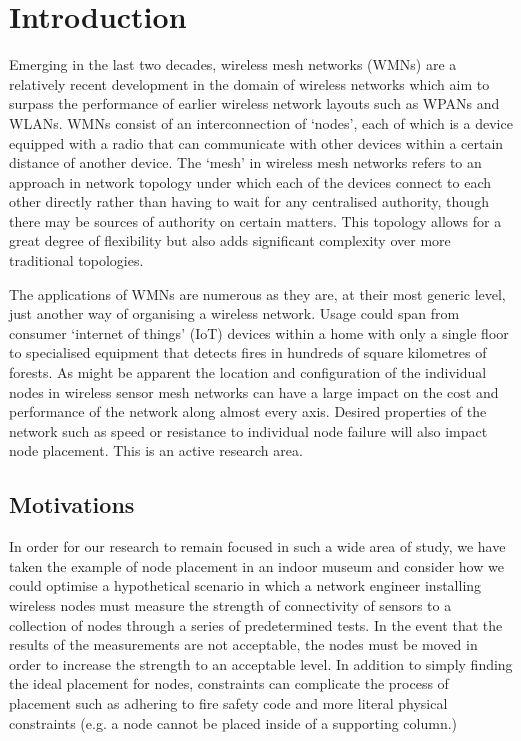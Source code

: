\section{Introduction}
	\label{sec:intro}
	
	Emerging in the last two decades, wireless mesh networks (WMNs) are a relatively recent development in the domain of wireless networks which aim to surpass the performance of earlier wireless network layouts such as WPANs and WLANs\cite{akyildiza47wireless}. WMNs consist of an interconnection of `nodes', each of which is a device equipped with a radio that can communicate with other devices within a certain distance of another device. The `mesh' in wireless mesh networks refers to an approach in network topology under which each of the devices connect to each other directly rather than having to wait for any centralised authority, though there may be sources of authority on certain matters. This topology allows for a great degree of flexibility but also adds significant complexity over more traditional topologies. 

	The applications of WMNs are numerous as they are, at their most generic level, just another way of organising a wireless network. Usage could span from consumer `internet of things' (IoT) devices within a home with only a single floor \cite{apte2018home} to specialised equipment that detects fires in hundreds of square kilometres of forests\cite{lloret2009wireless}\cite{jin2018evaluation}. As might be apparent the location and configuration of the individual nodes in wireless sensor mesh networks can have a large impact on the cost and performance of the network along almost every axis. Desired properties of the network such as speed or resistance to individual node failure will also impact node placement. This is an active research area\cite{younis2020placementsurvey}.

	
	\subsection{Motivations}
		\label{sec:intro_motivation} 
		
		In order for our research to remain focused in such a wide area of study, we have taken the example of node placement in an indoor museum and consider how we could optimise a hypothetical scenario in which a network engineer installing wireless nodes must measure the strength of connectivity of sensors to a collection of nodes through a series of predetermined tests. In the event that the results of the measurements are not acceptable, the nodes must be moved in order to increase the strength to an acceptable level. In addition to simply finding the ideal placement for nodes, constraints can complicate the process of placement such as adhering to fire safety code and more literal physical constraints (e.g. a node cannot be placed inside of a supporting column.)
	
